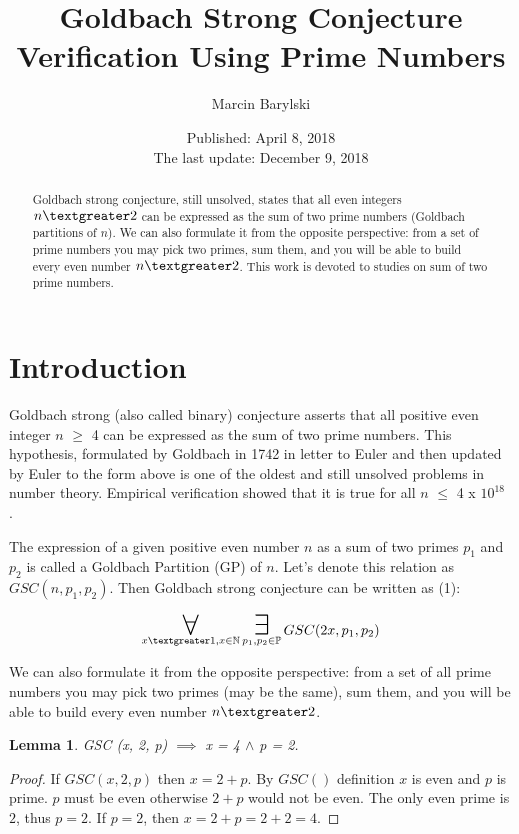 \documentclass[10pt,twocolumn]{article}
\title{Goldbach Strong Conjecture Verification Using Prime Numbers}
\author{Marcin Barylski}
\date{\small{Published: April 8, 2018 \\ The last update: December 9, 2018}}
\newtheorem{lemma}[theorem]{Lemma}
\newcommand\bigforall{\mbox{\huge $\mathsurround0pt\forall$}}
\newcommand\bigexists{\mbox{\huge $\mathsurround0pt\exists$}}
\begin{document}
\maketitle

\begin{abstract}
Goldbach strong conjecture, still unsolved, states that all even integers $n \textgreater 2$ can be expressed as the sum of two prime numbers (Goldbach partitions of $n$). We can also formulate it from the opposite perspective: from a set of prime numbers you may pick two primes, sum them, and you will be able to build every even number $n \textgreater 2$. This work is devoted to studies on sum of two prime numbers.
\end{abstract}

\section{Introduction}

Goldbach strong (also called binary) conjecture asserts that all positive even integer $n$ $\geq$ 4 can be expressed as the sum of two prime numbers. This hypothesis, formulated by Goldbach in 1742 in letter to Euler \cite{goldbach1742} and then updated by Euler to the form above is one of the oldest and still unsolved problems in number theory. Empirical verification showed that it is true for all $n$ $\leq$ 4 x $10^{18}$ \cite{oliveira2012} \cite{oliveira2013}.\par
The expression of a given positive even number $n$ as a sum of two primes $p_1$ and $p_2$ is called a Goldbach Partition (GP) of $n$.  Let's denote this relation as $GSC(n, p_1, p_2)$. Then Goldbach strong conjecture can be written as (1):

\begin{equation}
\displaystyle\mathop{\bigforall}_{x \textgreater 1, x \in \mathbb{N}} \displaystyle\mathop{\bigexists}_{p_1, p_2 \in \mathbb{P}} GSC (2x, p_1, p_2)
\end{equation}

We can also formulate it from the opposite perspective: from a set of all prime numbers you may pick two primes (may be the same), sum them, and you will be able to build every even number $n \textgreater 2$.

\begin{lemma}
GSC (x, 2, p) $\implies$ x = 4 $\land$ p = 2.
\end{lemma}
\begin{proof}
If $GSC (x, 2, p)$ then $x = 2 + p$. By $GSC()$ definition $x$ is even and $p$ is prime. $p$ must be even otherwise $2 + p$ would not be even. The only even prime is $2$, thus $p = 2$. If $p = 2$, then $x = 2 + p = 2 + 2 = 4$. 
\end{proof}
\end{document}
